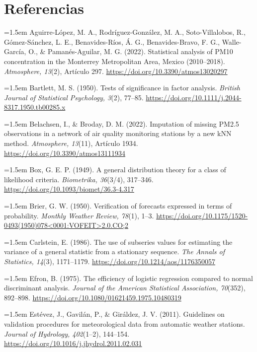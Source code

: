 \clearpage
\section*{Referencias}
\begingroup
\small
\setlength{\parskip}{3pt}
\newcommand{\refe}[1]{\par\noindent\hangindent=1.5em #1\par}

\refe{Aguirre-López, M. A., Rodríguez-González, M. A., Soto-Villalobos, R., Gómez-Sánchez, L. E., Benavides-Ríos, Á. G., Benavides-Bravo, F. G., Walle-García, O., \& Pamanés-Aguilar, M. G. (2022). Statistical analysis of PM10 concentration in the Monterrey Metropolitan Area, Mexico (2010–2018). \emph{Atmosphere, 13}(2), Artículo 297. \url{https://doi.org/10.3390/atmos13020297}}

\refe{Bartlett, M. S. (1950). Tests of significance in factor analysis. \emph{British Journal of Statistical Psychology, 3}(2), 77–85. \url{https://doi.org/10.1111/j.2044-8317.1950.tb00285.x}}

\refe{Belachsen, I., \& Broday, D. M. (2022). Imputation of missing PM2.5 observations in a network of air quality monitoring stations by a new kNN method. \emph{Atmosphere, 13}(11), Artículo 1934. \url{https://doi.org/10.3390/atmos13111934}}

\refe{Box, G. E. P. (1949). A general distribution theory for a class of likelihood criteria. \emph{Biometrika, 36}(3/4), 317–346. \url{https://doi.org/10.1093/biomet/36.3-4.317}}

\refe{Brier, G. W. (1950). Verification of forecasts expressed in terms of probability. \emph{Monthly Weather Review, 78}(1), 1–3. \url{https://doi.org/10.1175/1520-0493(1950)078<0001:VOFEIT>2.0.CO;2}}

\refe{Carlstein, E. (1986). The use of subseries values for estimating the variance of a general statistic from a stationary sequence. \emph{The Annals of Statistics, 14}(3), 1171–1179. \url{https://doi.org/10.1214/aos/1176350057}}

\refe{Efron, B. (1975). The efficiency of logistic regression compared to normal discriminant analysis. \emph{Journal of the American Statistical Association, 70}(352), 892–898. \url{https://doi.org/10.1080/01621459.1975.10480319}}

\refe{Estévez, J., Gavilán, P., \& Giráldez, J. V. (2011). Guidelines on validation procedures for meteorological data from automatic weather stations. \emph{Journal of Hydrology, 402}(1–2), 144–154. \url{https://doi.org/10.1016/j.jhydrol.2011.02.031}}

